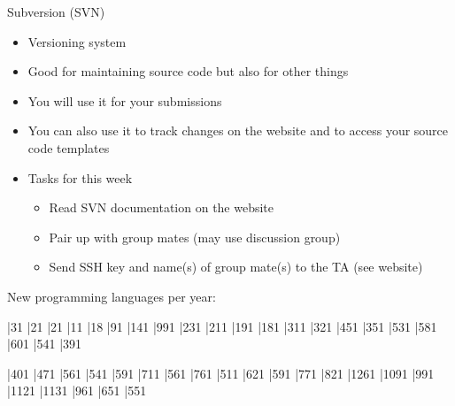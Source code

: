 \begin{slide*}
Subversion (SVN)

\begin{itemize}
\item Versioning system
\item Good for maintaining source code but also for other things
\item You will use it for your submissions
\item You can also use it to track changes on the website and to access your
source code templates
\item Tasks for this week
	\begin{itemize}
      \item Read SVN documentation on the website
      \item Pair up with group mates (may use discussion group)
      \item Send SSH key and name(s) of group mate(s) to the TA (see website) 
	\end{itemize}
\end{itemize} 
\vfill
\end{slide*}

 
\begin{slide*}
New programming languages per year:\\

\begin{barenv}
\setstyle{\scriptsize}
\bar{3}{1}
\bar{2}{1}
\bar{2}{1}
\bar{1}{1}
\bar{1}{8}
\bar{9}{1}
\bar{14}{1}
\bar{99}{1}
\bar{23}{1}
\bar{21}{1}
\bar{19}{1}
\bar{18}{1}
\bar{31}{1}
\bar{32}{1}
\bar{45}{1}
\bar{35}{1}
\bar{53}{1}
\bar{58}{1}
\bar{60}{1}
\bar{54}{1}
\bar{39}{1}
\end{barenv}
\vspace{8mm}
\begin{barenv}
\setstyle{\scriptsize}
\bar{40}{1}
\bar{47}{1}
\bar{56}{1}
\bar{54}{1}
\bar{59}{1}
\bar{71}{1}
\bar{56}{1}
\bar{76}{1}
\bar{51}{1}
\bar{62}{1}
\bar{59}{1}
\bar{77}{1}
\bar{82}{1}
\bar{126}{1}
\bar{109}{1}
\bar{99}{1}
\bar{112}{1}
\bar{113}{1}
\bar{96}{1}
\bar{65}{1}
\bar{55}{1}
\end{barenv}
\vfil
\end{slide*}

